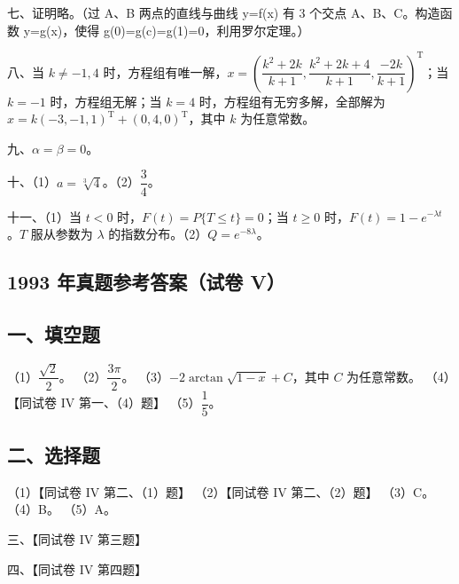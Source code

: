 \documentclass[UTF8,12pt]{ctexart}
\begin{document}
七、证明略。（过 A、B 两点的直线与曲线 y=f(x) 有 3 个交点 A、B、C。构造函数 y=g(x)，使得 g(0)=g(c)=g(1)=0，利用罗尔定理。）


八、当 \(\displaystyle k\ne-1,\allowbreak 4\) 时，方程组有唯一解，\(\displaystyle x=\left(\dfrac{\displaystyle k^2+2k}{\displaystyle k+1},\allowbreak \dfrac{\displaystyle k^2+2k+4}{\displaystyle k+1},\allowbreak \dfrac{\displaystyle -2k}{\displaystyle k+1}\right)^{\mathrm T}\)；当 \(\displaystyle k=-1\) 时，方程组无解；当 \(\displaystyle k=4\) 时，方程组有无穷多解，全部解为 \(\displaystyle x=k(-3,\allowbreak -1,\allowbreak 1)^{\mathrm T}+(0,\allowbreak 4,\allowbreak 0)^{\mathrm T}\)，其中 \(\displaystyle k\) 为任意常数。


九、\(\displaystyle \alpha=\beta=0\)。


十、（1）\(\displaystyle a=\sqrt[3]{4}\)。（2）\(\displaystyle \dfrac{\displaystyle 3}{\displaystyle 4}\)。


十一、（1）当 \(\displaystyle t<0\) 时，\(\displaystyle F(t)=P\{T\leq t\}=0\)；当 \(\displaystyle t\geq0\) 时，\(\displaystyle F(t)=1-e^{-\lambda t}\)。\(\displaystyle T\) 服从参数为 \(\displaystyle \lambda\) 的指数分布。（2）\(\displaystyle Q=e^{-8\lambda}\)。


\subsection*{1993 年真题参考答案（试卷 V）}

\subsection*{一、填空题}

（1）\(\displaystyle \dfrac{\displaystyle \sqrt2}{\displaystyle 2}\)。 （2）\(\displaystyle \dfrac{\displaystyle 3\pi}{\displaystyle 2}\)。 （3）\(\displaystyle -2\arctan\sqrt{1-x}+C\)，其中 \(\displaystyle C\) 为任意常数。 （4）【同试卷 IV 第一、（4）题】 （5）\(\displaystyle \dfrac{\displaystyle 1}{\displaystyle 5}\)。


\subsection*{二、选择题}

（1）【同试卷 IV 第二、（1）题】 （2）【同试卷 IV 第二、（2）题】 （3）C。 （4）B。 （5）A。


三、【同试卷 IV 第三题】


四、【同试卷 IV 第四题】
\end{document}
